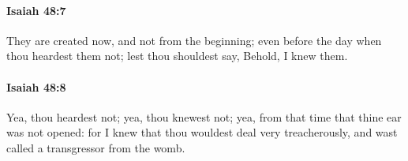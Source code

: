 		\paragraph{Isaiah 48:7} %
			\label{ISAIAH-48-7}

			They are created now, and not from the beginning; even before the day when thou heardest them not; lest thou shouldest say, Behold, I knew them.


		\paragraph{Isaiah 48:8} %
			\label{ISAIAH-48-8}

			Yea, thou heardest not; yea, thou knewest not; yea, from that time that thine ear was not opened: for I knew that thou wouldest deal very treacherously, and wast called a transgressor from the womb.


